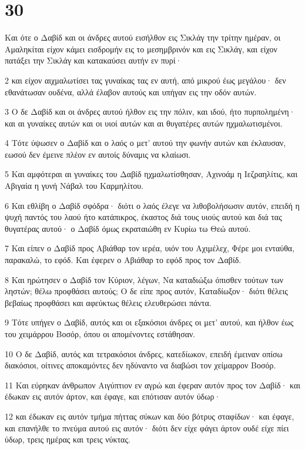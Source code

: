 \chapter{30}

\par Και ότε ο Δαβίδ και οι άνδρες αυτού εισήλθον εις Σικλάγ την τρίτην ημέραν, οι Αμαληκίται είχον κάμει εισδρομήν εις το μεσημβρινόν και εις Σικλάγ, και είχον πατάξει την Σικλάγ και κατακαύσει αυτήν εν πυρί·
\par 2 και είχον αιχμαλωτίσει τας γυναίκας τας εν αυτή, από μικρού έως μεγάλου· δεν εθανάτωσαν ουδένα, αλλά έλαβον αυτούς και υπήγαν εις την οδόν αυτών.
\par 3 Ο δε Δαβίδ και οι άνδρες αυτού ήλθον εις την πόλιν, και ιδού, ήτο πυρπολημένη· και αι γυναίκες αυτών και οι υιοί αυτών και αι θυγατέρες αυτών ηχμαλωτισμένοι.
\par 4 Τότε ύψωσεν ο Δαβίδ και ο λαός ο μετ' αυτού την φωνήν αυτών και έκλαυσαν, εωσού δεν έμεινε πλέον εν αυτοίς δύναμις να κλαίωσι.
\par 5 Και αμφότεραι αι γυναίκες του Δαβίδ ηχμαλωτίσθησαν, Αχινοάμ η Ιεζραηλίτις, και Αβιγαία η γυνή Νάβαλ του Καρμηλίτου.
\par 6 Και εθλίβη ο Δαβίδ σφόδρα· διότι ο λαός έλεγε να λιθοβολήσωσιν αυτόν, επειδή η ψυχή παντός του λαού ήτο κατάπικρος, έκαστος διά τους υιούς αυτού και διά τας θυγατέρας αυτού· ο Δαβίδ όμως εκραταιώθη εν Κυρίω τω Θεώ αυτού.
\par 7 Και είπεν ο Δαβίδ προς Αβιάθαρ τον ιερέα, υιόν του Αχιμέλεχ, Φέρε μοι ενταύθα, παρακαλώ, το εφόδ. Και έφερεν ο Αβιάθαρ το εφόδ προς τον Δαβίδ.
\par 8 Και ηρώτησεν ο Δαβίδ τον Κύριον, λέγων, Να καταδιώξω όπισθεν τούτων των ληστών; θέλω προφθάσει αυτούς; Ο δε είπε προς αυτόν, Καταδίωξον· διότι θέλεις βεβαίως προφθάσει και αφεύκτως θέλεις ελευθερώσει πάντα.
\par 9 Τότε υπήγεν ο Δαβίδ, αυτός και οι εξακόσιοι άνδρες οι μετ' αυτού, και ήλθον έως του χειμάρρου Βοσόρ, όπου οι απομένοντες εστάθησαν.
\par 10 Ο δε Δαβίδ, αυτός και τετρακόσιοι άνδρες, κατεδίωκον, επειδή έμειναν οπίσω διακόσιοι, οίτινες αποκαμόντες δεν ηδύναντο να διαβώσι τον χείμαρρον Βοσόρ.
\par 11 Και εύρηκαν άνθρωπον Αιγύπτιον εν αγρώ και έφεραν αυτόν προς τον Δαβίδ· και έδωκαν εις αυτόν άρτον, και έφαγε, και επότισαν αυτόν ύδωρ·
\par 12 και έδωκαν εις αυτόν τμήμα πήττας σύκων και δύο βότρυς σταφίδων· και έφαγε, και επανήλθε το πνεύμα αυτού εις αυτόν· διότι δεν είχε φάγει άρτον ουδέ είχε πίει ύδωρ, τρεις ημέρας και τρεις νύκτας.
